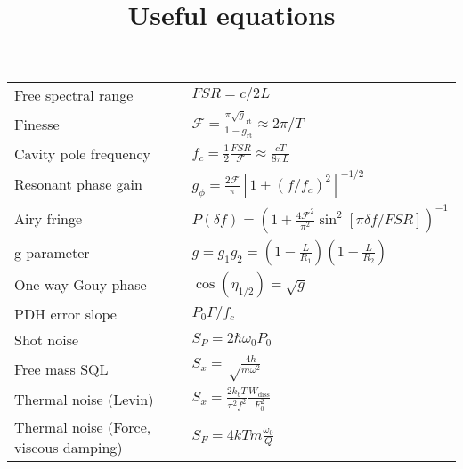 \documentclass{article}
\begin{document}
\title{Useful equations}
\maketitle

\Large
\begin{tabular}{p{2in}p{4in}}
  Free spectral range & $FSR = c/2 L$\\
  Finesse & $ \mathcal{F} = \frac{\pi \sqrt g_{\mathrm{rt}}}{1-g_{\mathrm{rt}}} \approx 2 \pi/ T$ \\
  Cavity pole frequency & $f_c = \frac{1}{2}\frac{FSR}{\mathcal{F}} \approx \frac{cT}{8\pi L}$\\
  Resonant phase gain & $g_\phi = \frac{2 \mathcal{F}}{\pi}\left[1+\left(f/f_c\right)^2\right]^{-1/2}$\\
  Airy fringe & $P(\delta f) = \left (1 + \frac{4 \mathcal{F}^2}{\pi^2} \sin^2 [
  \pi \delta f / FSR ] \right)^{-1} $ \\
  g-parameter & $g = g_1g_2 = (1 - \frac{L}{R_1})(1 - \frac{L}{R_2})$ \\
  One way Gouy phase & $\cos(\eta_{1/2}) = \sqrt g$ \\
  PDH error slope  & $P_0 \Gamma / f_c$\\
  Shot noise & $S_P = 2\hbar \omega_0 P_0$\\
  Free mass SQL & $S_x = \sqrt \frac{4 h}{m \omega^2}$\\
  Thermal noise (Levin) &  $S_x = \frac{2k_bT}{\pi^2f^2}\frac{W_{\mathrm{diss}}}{F_0^2}$\\
  Thermal noise (Force, viscous damping) & $S_F = 4kTm\frac{\omega_0}{Q}$\\

\end{tabular}
\end{document}
